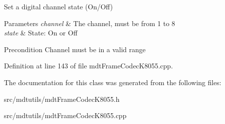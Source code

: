 Set a digital channel state (On/Off) 


\begin{DoxyParams}{Parameters}
{\em channel} & The channel, must be from 1 to 8 \\
\hline
{\em state} & State: On or Off \\
\hline
\end{DoxyParams}
\begin{DoxyPrecond}{Precondition}
Channel must be in a valid range 
\end{DoxyPrecond}


Definition at line 143 of file mdtFrameCodecK8055.cpp.



The documentation for this class was generated from the following files:\begin{DoxyCompactItemize}
\item 
src/mdtutils/mdtFrameCodecK8055.h\item 
src/mdtutils/mdtFrameCodecK8055.cpp\end{DoxyCompactItemize}
